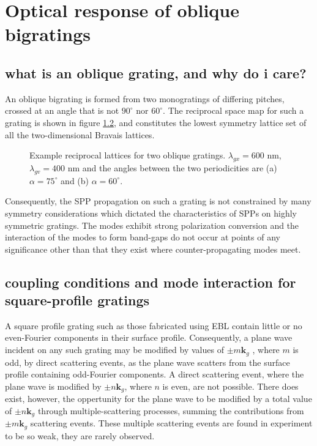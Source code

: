 \documentclass[oneside,11pt,book]{book}
\begin{document}
\chapter{Optical response of oblique bigratings}
\section{what is an oblique grating, and why do i care?}
An oblique bigrating is formed from two monogratings of differing pitches, crossed at an angle that is not $90^\circ$ nor $60^\circ$. The reciprocal space map for such a grating is shown in figure \ref{}, and constitutes the lowest symmetry lattice set of all the two-dimensional Bravais lattices.
\begin{figure}
\centering 
\caption{Example reciprocal lattices for two oblique gratings. $\lambda_{gx}= 600$ nm, $\lambda_{gv}=400$ nm and the angles between the two periodicities are (a) $\alpha = 75^\circ$ and (b) $\alpha= 60^\circ$. }
\end{figure} 
Consequently, the SPP propagation on such a grating is not constrained by many symmetry considerations which dictated the characteristics of SPPs on highly symmetric gratings. The modes exhibit strong polarization conversion and the interaction of the modes to form band-gaps do not occur at points of any significance other than that they exist where counter-propagating modes meet.
\section{coupling conditions and mode interaction for square-profile gratings}
A square profile grating such as those fabricated using EBL contain little or no even-Fourier components in their surface profile. Consequently, a plane wave  incident on any such grating may be modified by values of $\pm m\mathbf{k}_g$ , where $m$ is odd, by direct scattering events, as the plane wave scatters from the surface profile containing odd-Fourier components. A direct scattering event, where the plane wave is modified by $\pm n\mathbf{k}_g$, where $n$ is even, are not possible. There does exist, however, the oppertunity for the plane wave to be modified by a total value of $\pm n\mathbf{k}_g$ through multiple-scattering processes, summing the contributions from  $\pm m\mathbf{k}_g$ scattering events. These multiple scattering events are found in experiment to be so weak, they are rarely observed. 
\end{document}
